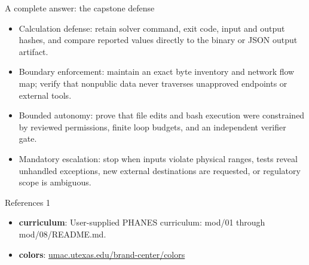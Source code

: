 \documentclass[aspectratio=169,11pt]{beamer}
\begin{document}
\begin{frame}[t,fragile]{A complete answer: the capstone defense}
\fontsize{11.5}{14}\selectfont
\begin{itemize}\setlength{\itemsep}{2mm}
\item Calculation defense: retain solver command, exit code, input and output hashes, and compare reported values directly to the binary or JSON output artifact.
\item Boundary enforcement: maintain an exact byte inventory and network flow map; verify that nonpublic data never traverses unapproved endpoints or external tools.
\item Bounded autonomy: prove that file edits and bash execution were constrained by reviewed permissions, finite loop budgets, and an independent verifier gate.
\item Mandatory escalation: stop when inputs violate physical ranges, tests reveal unhandled exceptions, new external destinations are requested, or regulatory scope is ambiguous.
\end{itemize}
\end{frame}
\begin{frame}[t]{References 1}
\fontsize{9}{12}\selectfont\begin{itemize}\setlength{\itemsep}{3mm}
\item \textbf{curriculum}: User-supplied PHANES curriculum: mod/01 through mod/08/README.md.
\item \textbf{colors}: \href{https://umac.utexas.edu/brand-center/colors/}{umac.utexas.edu/brand-center/colors}
\end{itemize}\end{frame}
\end{document}
